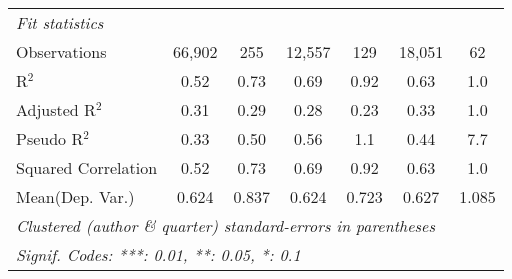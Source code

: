 \begin{tabular}{lcccccc}
   \midrule
   \emph{Fit statistics}\\
   Observations                                               & 66,902        & 255          & 12,557        & 129         & 18,051         & 62\\  
   R$^2$                                                      & 0.52          & 0.73         & 0.69          & 0.92        & 0.63           & 1.0\\  
   Adjusted R$^2$                                             & 0.31          & 0.29         & 0.28          & 0.23        & 0.33           & 1.0\\  
   Pseudo R$^2$                                               & 0.33          & 0.50         & 0.56          & 1.1         & 0.44           & 7.7\\  
   Squared Correlation                                        & 0.52          & 0.73         & 0.69          & 0.92        & 0.63           & 1.0\\  
Mean(Dep. Var.) & 0.624 & 0.837 & 0.624 & 0.723 & 0.627 & 1.085 \\
   \midrule \midrule
   \multicolumn{7}{l}{\emph{Clustered (author \& quarter) standard-errors in parentheses}}\\
   \multicolumn{7}{l}{\emph{Signif. Codes: ***: 0.01, **: 0.05, *: 0.1}}\\
\end{tabular}
\par\endgroup
